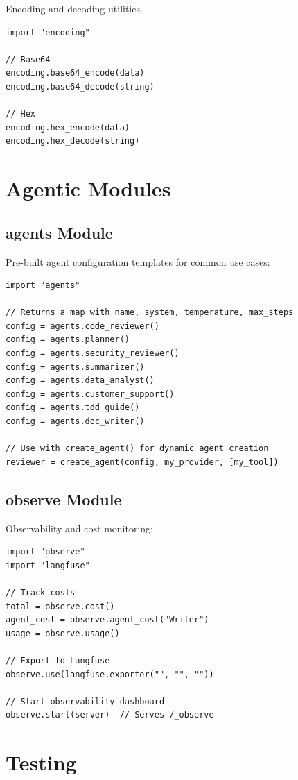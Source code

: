 Encoding and decoding utilities.

\begin{lstlisting}
import "encoding"

// Base64
encoding.base64_encode(data)
encoding.base64_decode(string)

// Hex
encoding.hex_encode(data)
encoding.hex_decode(string)
\end{lstlisting}

\section{Agentic Modules}

\subsection{agents Module}

Pre-built agent configuration templates for common use cases:

\begin{lstlisting}
import "agents"

// Returns a map with name, system, temperature, max_steps
config = agents.code_reviewer()
config = agents.planner()
config = agents.security_reviewer()
config = agents.summarizer()
config = agents.data_analyst()
config = agents.customer_support()
config = agents.tdd_guide()
config = agents.doc_writer()

// Use with create_agent() for dynamic agent creation
reviewer = create_agent(config, my_provider, [my_tool])
\end{lstlisting}

\subsection{observe Module}

Observability and cost monitoring:

\begin{lstlisting}
import "observe"
import "langfuse"

// Track costs
total = observe.cost()
agent_cost = observe.agent_cost("Writer")
usage = observe.usage()

// Export to Langfuse
observe.use(langfuse.exporter("", "", ""))

// Start observability dashboard
observe.start(server)  // Serves /_observe
\end{lstlisting}

\section{Testing}

